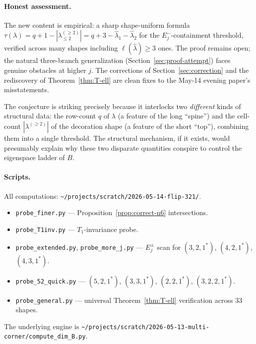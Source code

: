 \documentclass[11pt]{article}
\theoremstyle{definition}
\newcommand{\hatl}{\widehat\lambda}
\newcommand{\decl}{\lambda^{(\ge 2)}}
\newcommand{\decltwo}{\decl_{\le 2}}
\begin{document}
\paragraph{Honest assessment.}
The new content is empirical: a sharp shape-uniform formula
$\tau(\lambda) = q + 1 - |\decltwo| = q + 3 - \hatl_1 - \hatl_2$
for the $E_j^-$-containment threshold, verified across many shapes
including $\ell(\hatl) \ge 3$ ones.  The proof remains open;
the natural three-branch generalization (Section~\ref{sec:proof-attempt})
faces genuine obstacles at higher $j$.  The corrections of
Section~\ref{sec:correction} and the rediscovery of
Theorem~\ref{thm:T-ell} are clean fixes to the May-14 evening
paper's misstatements.

The conjecture is striking precisely because it interlocks two
\emph{different} kinds of structural data: the row-count $q$ of
$\lambda$ (a feature of the long ``spine'') and the cell-count
$|\decl|$ of the decoration shape (a feature of the short
``top''), combining them into a single threshold.  The structural
mechanism, if it exists, would presumably explain why these two
disparate quantities conspire to control the eigenspace ladder of
$B$.

\paragraph{Scripts.}
All computations: \texttt{\textasciitilde/projects/scratch/2026-05-14-flip-321/}.
\begin{itemize}[topsep=0.2em,itemsep=0.1em]
\item \texttt{probe\_finer.py} --- Proposition~\ref{prop:correct-n6}
intersections.
\item \texttt{probe\_T1inv.py} --- $T_1$-invariance probe.
\item \texttt{probe\_extended.py},
\texttt{probe\_more\_j.py} --- $E_j^\pm$ scan for $(3, 2, 1^*)$,
$(4, 2, 1^*)$, $(4, 3, 1^*)$.
\item \texttt{probe\_52\_quick.py} --- $(5, 2, 1^*)$,
$(3, 3, 1^*)$, $(2, 2, 1^*)$, $(3, 2, 2, 1^*)$.
\item \texttt{probe\_general.py} --- universal Theorem~\ref{thm:T-ell}
verification across 33 shapes.
\end{itemize}

The underlying engine is
\texttt{\textasciitilde/projects/scratch/2026-05-13-multi-corner/compute\_dim\_B.py}.
\end{document}
